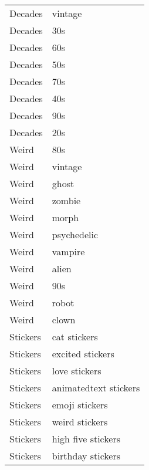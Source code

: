 \begin{supertabular}{l p{0.25\textwidth}}
          Decades &                            vintage \\
          Decades &                                30s \\
          Decades &                                60s \\
          Decades &                                50s \\
          Decades &                                70s \\
          Decades &                                40s \\
          Decades &                                90s \\
          Decades &                                20s \\
            Weird &                                80s \\
            Weird &                            vintage \\
            Weird &                              ghost \\
            Weird &                             zombie \\
            Weird &                              morph \\
            Weird &                        psychedelic \\
            Weird &                            vampire \\
            Weird &                              alien \\
            Weird &                                90s \\
            Weird &                              robot \\
            Weird &                              clown \\
         Stickers &                       cat stickers \\
         Stickers &                   excited stickers \\
         Stickers &                      love stickers \\
         Stickers &              animatedtext stickers \\
         Stickers &                     emoji stickers \\
         Stickers &                     weird stickers \\
         Stickers &                 high five stickers \\
         Stickers &                  birthday stickers \\

\end{supertabular}
